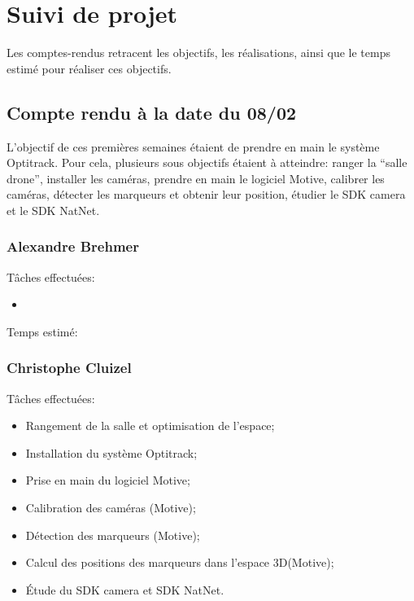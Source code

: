 \chapter{Suivi de projet}
Les comptes-rendus retracent les objectifs, les réalisations, ainsi que le temps estimé pour réaliser ces objectifs.

\section{Compte rendu à la date du 08/02}
L'objectif de ces premières semaines étaient de prendre en main le système Optitrack. Pour cela, plusieurs sous objectifs étaient à atteindre: ranger la ``salle drone'', installer les caméras, prendre en main le logiciel Motive, calibrer les caméras, détecter les marqueurs et obtenir leur position, étudier le SDK camera et le SDK NatNet.

\subsection{Alexandre Brehmer}
Tâches effectuées:
\begin{itemize}
	\item {} \\
\end{itemize}

Temps estimé:


\subsection{Christophe Cluizel}

Tâches effectuées:
\begin{itemize}
	\item Rangement de la salle et optimisation de l'espace;
	\item Installation du système Optitrack;
	\item Prise en main du logiciel Motive;
	\item Calibration des caméras (Motive);
	\item Détection des marqueurs (Motive);
	\item Calcul des positions des marqueurs dans l'espace 3D\@ (Motive);
	\item Étude du SDK camera et SDK NatNet. \\
\end{itemize}

